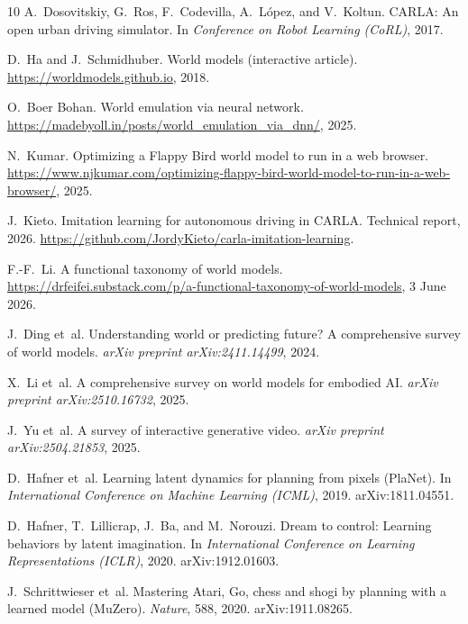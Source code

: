\documentclass[11pt]{article}
\begin{document}
\begin{thebibliography}{10}
A.~Dosovitskiy, G.~Ros, F.~Codevilla, A.~L\'opez, and V.~Koltun.
\newblock CARLA: An open urban driving simulator.
\newblock In \emph{Conference on Robot Learning (CoRL)}, 2017.

D.~Ha and J.~Schmidhuber.
\newblock World models (interactive article).
\newblock \url{https://worldmodels.github.io}, 2018.

O.~Boer Bohan.
\newblock World emulation via neural network.
\newblock \url{https://madebyoll.in/posts/world_emulation_via_dnn/}, 2025.

N.~Kumar.
\newblock Optimizing a Flappy Bird world model to run in a web browser.
\newblock \url{https://www.njkumar.com/optimizing-flappy-bird-world-model-to-run-in-a-web-browser/}, 2025.

J.~Kieto.
\newblock Imitation learning for autonomous driving in CARLA.
\newblock Technical report, 2026. \url{https://github.com/JordyKieto/carla-imitation-learning}.

F.-F.~Li.
\newblock A functional taxonomy of world models.
\newblock \url{https://drfeifei.substack.com/p/a-functional-taxonomy-of-world-models}, 3 June 2026.

J.~Ding et~al.
\newblock Understanding world or predicting future? A comprehensive survey of world models.
\newblock \emph{arXiv preprint arXiv:2411.14499}, 2024.

X.~Li et~al.
\newblock A comprehensive survey on world models for embodied AI.
\newblock \emph{arXiv preprint arXiv:2510.16732}, 2025.

J.~Yu et~al.
\newblock A survey of interactive generative video.
\newblock \emph{arXiv preprint arXiv:2504.21853}, 2025.

D.~Hafner et~al.
\newblock Learning latent dynamics for planning from pixels (PlaNet).
\newblock In \emph{International Conference on Machine Learning (ICML)}, 2019. arXiv:1811.04551.

D.~Hafner, T.~Lillicrap, J.~Ba, and M.~Norouzi.
\newblock Dream to control: Learning behaviors by latent imagination.
\newblock In \emph{International Conference on Learning Representations (ICLR)}, 2020. arXiv:1912.01603.

J.~Schrittwieser et~al.
\newblock Mastering Atari, Go, chess and shogi by planning with a learned model (MuZero).
\newblock \emph{Nature}, 588, 2020. arXiv:1911.08265.


\end{thebibliography}
\end{document}
